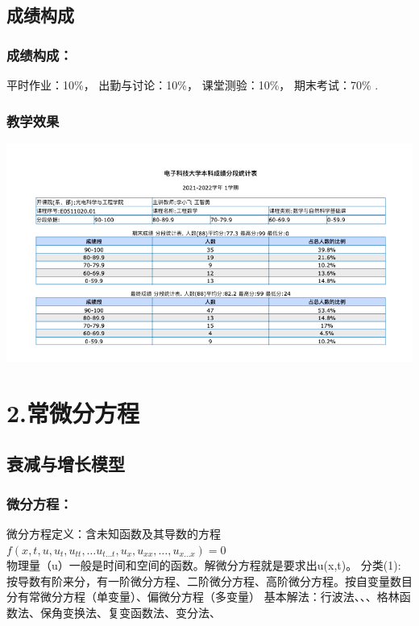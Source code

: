 \subsection{成绩构成}
\begin{frame}
	\frametitle{成绩构成：}
		\begin{enumerate}
		\IItem 平时作业：10\%，
		\vspace{0.8cm}
		\IItem 出勤与讨论：10\%，
		\vspace{0.8cm}
		\IItem 课堂测验：10\%，
		\vspace{0.8cm}
		\IItem 期末考试：70\% .
		\end{enumerate}	
\end{frame}

\begin{frame} [t]
    \frametitle{教学效果}
    \centering
    \includegraphics[width=1.0\textwidth]{figs/exam1.png}
\end{frame}

\section{2.常微分方程}
\subsection{衰减与增长模型}
\begin{frame}
	\frametitle{微分方程：}
    \begin{enumerate}
    \IItem 微分方程定义：含未知函数及其导数的方程 \\
    	$f\left(x,t, u, u_t,u_{tt}, \ldots u_{t \ldots t}, u_{x}, u_{xx}, \ldots, u_{x \ldots x} \right)=0$ \\
    	\vspace{0.5cm}
 		物理量（u）一般是时间和空间的函数。解微分方程就是要求出u(x,t)。
	\IItem 分类(1): 按导数有阶来分，有一阶微分方程、二阶微分方程、高阶微分方程。按自变量数目分有常微分方程（单变量）、偏微分方程（多变量） 
    	\vspace{0.5cm}
    \IItem 基本解法：行波法、{\color{deepred}{分离变量法}}、{\color{deepred}{积分变换法}}、格林函数法、保角变换法、复变函数法、变分法、\color{deepred}{级数展开法}         
    \end{enumerate}
\end{frame}

